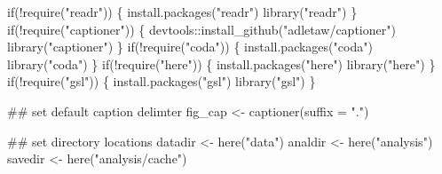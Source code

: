 \documentclass[11pt,]{article}
\newenvironment{Shaded}{}{}
\newcommand{\CommentTok}[1]{\textcolor[rgb]{0.00,0.50,0.00}{#1}}
\newcommand{\ControlFlowTok}[1]{\textcolor[rgb]{0.00,0.00,1.00}{#1}}
\newcommand{\DataTypeTok}[1]{#1}
\newcommand{\KeywordTok}[1]{\textcolor[rgb]{0.00,0.00,1.00}{#1}}
\newcommand{\NormalTok}[1]{#1}
\newcommand{\OperatorTok}[1]{#1}
\newcommand{\StringTok}[1]{\textcolor[rgb]{0.00,0.50,0.50}{#1}}
\begin{document}
\begin{Shaded}
\begin{Highlighting}[]
\ControlFlowTok{if}\NormalTok{(}\OperatorTok{!}\KeywordTok{require}\NormalTok{(}\StringTok{"readr"}\NormalTok{)) \{}
  \KeywordTok{install.packages}\NormalTok{(}\StringTok{"readr"}\NormalTok{)}
  \KeywordTok{library}\NormalTok{(}\StringTok{"readr"}\NormalTok{)}
\NormalTok{\}}
\ControlFlowTok{if}\NormalTok{(}\OperatorTok{!}\KeywordTok{require}\NormalTok{(}\StringTok{"captioner"}\NormalTok{)) \{}
\NormalTok{  devtools}\OperatorTok{::}\KeywordTok{install_github}\NormalTok{(}\StringTok{"adletaw/captioner"}\NormalTok{)}
  \KeywordTok{library}\NormalTok{(}\StringTok{"captioner"}\NormalTok{)}
\NormalTok{\}}
\ControlFlowTok{if}\NormalTok{(}\OperatorTok{!}\KeywordTok{require}\NormalTok{(}\StringTok{"coda"}\NormalTok{)) \{}
  \KeywordTok{install.packages}\NormalTok{(}\StringTok{"coda"}\NormalTok{)}
  \KeywordTok{library}\NormalTok{(}\StringTok{"coda"}\NormalTok{)}
\NormalTok{\}}
\ControlFlowTok{if}\NormalTok{(}\OperatorTok{!}\KeywordTok{require}\NormalTok{(}\StringTok{"here"}\NormalTok{)) \{}
  \KeywordTok{install.packages}\NormalTok{(}\StringTok{"here"}\NormalTok{)}
  \KeywordTok{library}\NormalTok{(}\StringTok{"here"}\NormalTok{)}
\NormalTok{\}}
\ControlFlowTok{if}\NormalTok{(}\OperatorTok{!}\KeywordTok{require}\NormalTok{(}\StringTok{"gsl"}\NormalTok{)) \{}
  \KeywordTok{install.packages}\NormalTok{(}\StringTok{"gsl"}\NormalTok{)}
  \KeywordTok{library}\NormalTok{(}\StringTok{"gsl"}\NormalTok{)}
\NormalTok{\}}

\CommentTok{## set default caption delimter}
\NormalTok{fig_cap <-}\StringTok{ }\KeywordTok{captioner}\NormalTok{(}\DataTypeTok{suffix =} \StringTok{"."}\NormalTok{)}

\CommentTok{## set directory locations}
\NormalTok{datadir <-}\StringTok{ }\KeywordTok{here}\NormalTok{(}\StringTok{"data"}\NormalTok{)}
\NormalTok{analdir <-}\StringTok{ }\KeywordTok{here}\NormalTok{(}\StringTok{"analysis"}\NormalTok{)}
\NormalTok{savedir <-}\StringTok{ }\KeywordTok{here}\NormalTok{(}\StringTok{"analysis/cache"}\NormalTok{)}


\end{Highlighting}
\end{Shaded}
\end{document}
